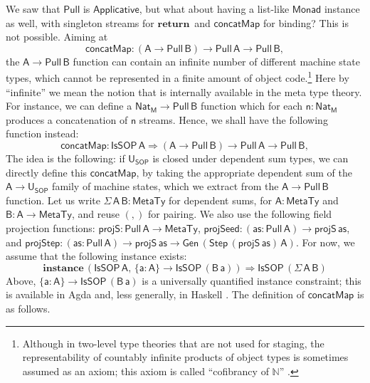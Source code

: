 \documentclass[acmsmall,screen,review,anonymous]{acmart}
\newcommand{\mit}[1]{{\mathsf{#1}}}
\newcommand{\msf}[1]{{\mathsf{#1}}}
\newcommand{\mbf}[1]{{\mathbf{#1}}}
\newcommand{\return}{\mbf{return}\,}
\newcommand{\M}{\msf{M}}
\newcommand{\vas}{\mathsf{as}}
\newcommand{\vn}{\mathsf{n}}
\newcommand{\vA}{\mathsf{A}}
\newcommand{\vB}{\mathsf{B}}
\newcommand{\va}{\mathsf{a}}
\newcommand{\USOP}{\msf{U}_{\msf{SOP}}}
\newcommand{\IsSOP}{\msf{IsSOP}}
\newcommand{\Monad}{\msf{Monad}}
\newcommand{\Applicative}{\msf{Applicative}}
\newcommand{\concatMap}{\msf{concatMap}}
\newcommand{\MTy}{\msf{MetaTy}}
\newcommand{\Nat}{\msf{Nat}}
\theoremstyle{remark}
\newcommand{\instance}{\mbf{instance}\,}
\newcommand{\Gen}{\msf{Gen}}
\newcommand{\RA}{\Rightarrow}
\newcommand{\Step}{\msf{Step}}
\newcommand{\Pull}{\msf{Pull}}
\begin{document}
We saw that $\Pull$ is $\Applicative$, but what about having a list-like
$\Monad$ instance as well, with singleton streams for $\return$ and $\concatMap$
for binding? This is not possible. Aiming at
\[ \concatMap : (\vA \to \Pull\,\vB) \to \Pull\,\vA \to \Pull\,\vB, \]
the $\vA \to \Pull\,\vB$ function can contain an infinite number of different
machine state types, which cannot be represented in a finite amount of object
code.\footnote{Although in two-level type theories that are not used for
staging, the representability of countably infinite products of object types is
sometimes assumed as an axiom; this axiom is called ``cofibrancy of
$\mathbb{N}$'' \cite{TODO}.} Here by ``infinite'' we mean the notion that is
internally available in the meta type theory. For instance, we can define a
$\Nat_\M \to \Pull\,\vB$ function which for each $\vn : \Nat_\M$ produces a
concatenation of $\vn$ streams. Hence, we shall have the following function
instead:
\[ \concatMap : \IsSOP\,\vA \RA (\vA \to \Pull\,\vB) \to \Pull\,\vA \to \Pull\,\vB, \]
The idea is the following: if $\USOP$ is closed under dependent sum types, we
can directly define this $\concatMap$, by taking the appropriate dependent sum
of the $\vA \to \USOP$ family of machine states, which we extract from the $\vA
\to \Pull\,\vB$ function. Let us write $\Sigma\,\vA\,\vB : \MTy$ for dependent
sums, for $\vA : \MTy$ and $\vB : \vA \to \MTy$, and reuse $({,})$ for pairing.
We also use the following field projection functions: $\mit{projS} : \Pull\,\vA
\to \MTy$, $\mit{projSeed} : (\vas : \Pull\,\vA) \to \mit{projS}\,\vas$, and
$\mit{projStep} : (\vas : \Pull\,\vA) \to \mit{projS}\,\vas \to
\Gen\,(\Step\,(\mit{projS}\,\vas)\,\vA)$.  For now, we assume that the following
instance exists:
\[ \instance (\IsSOP\,\vA,\,\{\va : \vA\} \to \IsSOP\,(\vB\,\va)) \RA \IsSOP\,(\Sigma\,\vA\,\vB) \]
Above, $\{\va : \vA\} \to \IsSOP\,(\vB\,\va)$ is a universally quantified
instance constraint; this is available in Agda and, less generally, in Haskell
\cite{TODO}. The definition of $\concatMap$ is as follows.
\end{document}
